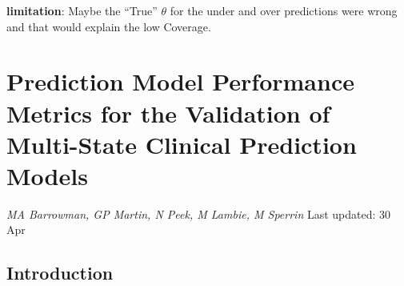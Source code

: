 \documentclass[12pt,PhD,twoside,openright]{muthesis}
\begin{document}
\textbf{limitation}: Maybe the ``True'' \(\theta\) for the under and over predictions were wrong and that would explain the low Coverage.

\hypertarget{chap-performance-metrics}{%
\chapter{Prediction Model Performance Metrics for the Validation of Multi-State Clinical Prediction Models}\label{chap-performance-metrics}}

\emph{MA Barrowman, GP Martin, N Peek, M Lambie, M Sperrin}
Last updated: 30 Apr

\hypertarget{introduction-5}{%
\section{Introduction}\label{introduction-5}}
\end{document}
